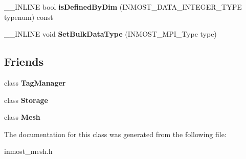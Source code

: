 \begin{DoxyCompactItemize}
\item 
\hypertarget{classINMOST_1_1Tag_a33a5c5e9c29033606b4b88ddbae20187}{\-\_\-\-\_\-\-I\-N\-L\-I\-N\-E bool {\bfseries is\-Defined\-By\-Dim} (I\-N\-M\-O\-S\-T\-\_\-\-D\-A\-T\-A\-\_\-\-I\-N\-T\-E\-G\-E\-R\-\_\-\-T\-Y\-P\-E typenum) const }\label{classINMOST_1_1Tag_a33a5c5e9c29033606b4b88ddbae20187}

\item 
\hypertarget{classINMOST_1_1Tag_a6007500c34ab4ddffd9a0283678d0ba6}{\-\_\-\-\_\-\-I\-N\-L\-I\-N\-E void {\bfseries Set\-Bulk\-Data\-Type} (I\-N\-M\-O\-S\-T\-\_\-\-M\-P\-I\-\_\-\-Type type)}\label{classINMOST_1_1Tag_a6007500c34ab4ddffd9a0283678d0ba6}

\end{DoxyCompactItemize}
\subsection*{Friends}
\begin{DoxyCompactItemize}
\item 
\hypertarget{classINMOST_1_1Tag_a49b2688bfa740d6565767541de3bd180}{class {\bfseries Tag\-Manager}}\label{classINMOST_1_1Tag_a49b2688bfa740d6565767541de3bd180}

\item 
\hypertarget{classINMOST_1_1Tag_ab647623b3295040f83d3afb2a502a223}{class {\bfseries Storage}}\label{classINMOST_1_1Tag_ab647623b3295040f83d3afb2a502a223}

\item 
\hypertarget{classINMOST_1_1Tag_aa41a130f156b145bffb3f4b5172c4c93}{class {\bfseries Mesh}}\label{classINMOST_1_1Tag_aa41a130f156b145bffb3f4b5172c4c93}

\end{DoxyCompactItemize}


The documentation for this class was generated from the following file\-:\begin{DoxyCompactItemize}
\item 
inmost\-\_\-mesh.\-h\end{DoxyCompactItemize}

